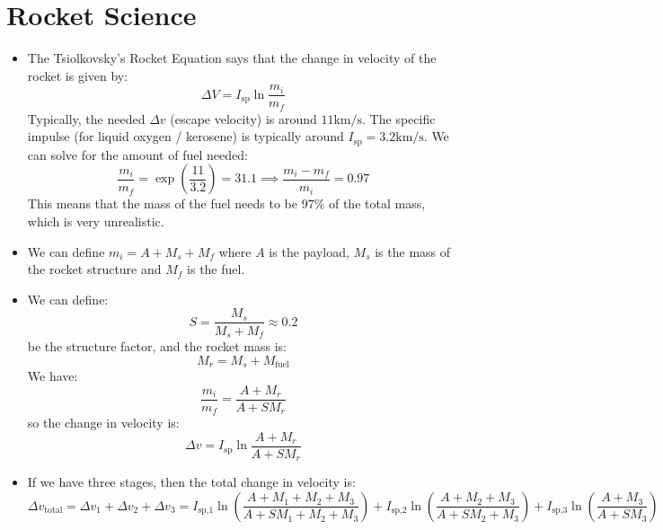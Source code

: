 \section{Rocket Science}
\begin{itemize}
    \item The Tsiolkovsky's Rocket Equation says that the change in velocity of the rocket is given by:
    \begin{equation}
        \Delta V = I_\text{sp}  \ln \frac{m_i}{m_f}
    \end{equation}
    Typically, the needed $\Delta v$ (escape velocity) is around $11\si{\kilo\meter\per\second}$. The specific impulse (for liquid oxygen / kerosene) is typically around $I_\text{sp} = 3.2 \si{\kilo\meter\per\second}$. We can solve for the amount of fuel needed:
    \begin{equation}
        \frac{m_i}{m_f} = \exp\left(\frac{11}{3.2}\right) = 31.1 \implies \frac{m_i-m_f}{m_i} = 0.97
    \end{equation}
    This means that the mass of the fuel needs to be $97\%$ of the total mass, which is very unrealistic.
    \item We can define $m_i = A + M_s + M_f$ where $A$ is the payload, $M_s$ is the mass of the rocket structure and $M_f$ is the fuel.
    \item We can define:
    \begin{equation}
        S = \frac{M_s}{M_s+M_f} \approx 0.2
    \end{equation}
    be the structure factor, and the rocket mass is:
    \begin{equation}
        M_r = M_s + M_\text{fuel}
    \end{equation}
    We have:
    \begin{equation}
        \frac{m_i}{m_f} = \frac{A+M_r}{A+SM_r}
    \end{equation}
    so the change in velocity is:
    \begin{equation}
        \Delta v = I_\text{sp} \ln \frac{A+M_r}{A+SM_r}
    \end{equation}
    \item If we have three stages, then the total change in velocity is:
    \begin{equation*}
        \Delta v_\text{total} = \Delta v_1 + \Delta v_2 + \Delta v_3 = I_\text{sp,1} \ln\left(\frac{A+M_1+M_2+M_3}{A+SM_1+M_2+M_3} \right) + I_\text{sp,2} \ln\left(\frac{A+M_2+M_3}{A+SM_2+M_3} \right)  + I_\text{sp,3} \ln\left(\frac{A+M_3}{A+SM_3} \right) 
    \end{equation*}

\end{itemize}
